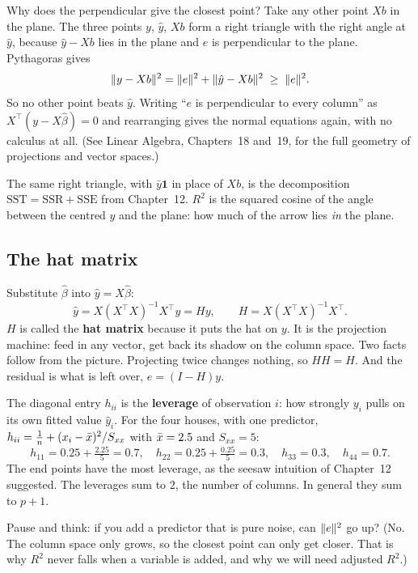 \begin{whybox}
Why does the perpendicular give the closest point? Take any other point $Xb$ in the
plane. The three points $y$, $\hat y$, $Xb$ form a right triangle with the right angle
at $\hat y$, because $\hat y - Xb$ lies in the plane and $e$ is perpendicular to the
plane. Pythagoras gives
\[
  \lVert y - Xb\rVert^2 = \lVert e\rVert^2 + \lVert\hat y - Xb\rVert^2 \;\ge\; \lVert e\rVert^2 .
\]
So no other point beats $\hat y$. Writing ``$e$ is perpendicular to every column'' as
$X^\top(y - X\hat\beta) = 0$ and rearranging gives the normal equations again, with no
calculus at all. (See Linear Algebra, Chapters~18 and~19, for the full geometry of projections and vector spaces.)
\end{whybox}

The same right triangle, with $\bar y\mathbf 1$ in place of $Xb$, is the decomposition
$\text{SST} = \text{SSR} + \text{SSE}$ from Chapter~12. $R^2$ is the squared cosine of the
angle between the centred $y$ and the plane: how much of the arrow lies \emph{in} the
plane.

\subsection{The hat matrix}

Substitute $\hat\beta$ into $\hat y = X\hat\beta$:
\[
  \hat y = X(X^\top X)^{-1}X^\top y = Hy, \qquad H = X(X^\top X)^{-1}X^\top .
\]
$H$ is called the \textbf{hat matrix} because it puts the hat on $y$. It is the
projection machine: feed in any vector, get back its shadow on the column space.
Two facts follow from the picture. Projecting twice changes nothing, so $HH = H$. And the
residual is what is left over, $e = (I - H)y$.

The diagonal entry $h_{ii}$ is the \textbf{leverage} of observation $i$: how strongly
$y_i$ pulls on its own fitted value $\hat y_i$. For the four houses, with one predictor,
$h_{ii} = \tfrac1n + (x_i-\bar{x})^2/S_{xx}$ with $\bar{x} = 2.5$ and $S_{xx} = 5$:
\[
  h_{11} = 0.25 + \tfrac{2.25}{5} = 0.7,\quad h_{22} = 0.25 + \tfrac{0.25}{5} = 0.3,\quad
  h_{33} = 0.3,\quad h_{44} = 0.7 .
\]
The end points have the most leverage, as the seesaw intuition of Chapter~12 suggested.
The leverages sum to $2$, the number of columns. In general they sum to $p+1$.

\begin{recoverybox}
Pause and think: if you add a predictor that is pure noise, can $\lVert e\rVert^2$ go up?
(No. The column space only grows, so the closest point can only get closer. That is why
$R^2$ never falls when a variable is added, and why we will need adjusted $R^2$.)
\end{recoverybox}

